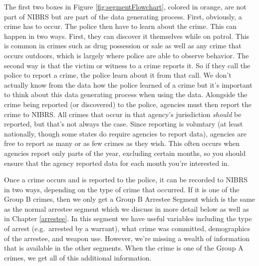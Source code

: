 \documentclass[
]{krantz}
\begin{document}
The first two boxes in Figure \ref{fig:segmentFlowchart},
colored in orange, are not part of NIBRS but are part of the
data generating process. First, obviously, a crime has to
occur. The police then have to learn about the crime. This
can happen in two ways. First, they can discover it
themselves while on patrol. This is common in crimes such as
drug possession or sale as well as any crime that occurs
outdoors, which is largely where police are able to observe
behavior. The second way is that the victim or witness to a
crime reports it. So if they call the police to report a
crime, the police learn about it from that call. We don't
actually know from the data how the police learned of a
crime but it's important to think about this data generating
process when using the data. Alongside the crime being
reported (or discovered) to the police, agencies must then
report the crime to NIBRS. All crimes that occur in that
agency's jurisdiction \emph{should} be reported, but that's
not always the case. Since reporting is voluntary (at least
nationally, though some states do require agencies to report
data), agencies are free to report as many or as few crimes
as they wish. This often occurs when agencies report only
parts of the year, excluding certain months, so you should
ensure that the agency reported data for each month you're
interested in.

Once a crime occurs and is reported to the police, it can be
recorded to NIBRS in two ways, depending on the type of
crime that occurred. If it is one of the Group B crimes,
then we only get a Group B Arrestee Segment which is the
same as the normal arrestee segment which we discuss in more
detail below as well as in Chapter \ref{arrestee}. In this
segment we have useful variables including the type of
arrest (e.g.~arrested by a warrant), what crime was
committed, demographics of the arrestee, and weapon use.
However, we're missing a wealth of information that is
available in the other segments. When the crime is one of
the Group A crimes, we get all of this additional
information.
\end{document}
